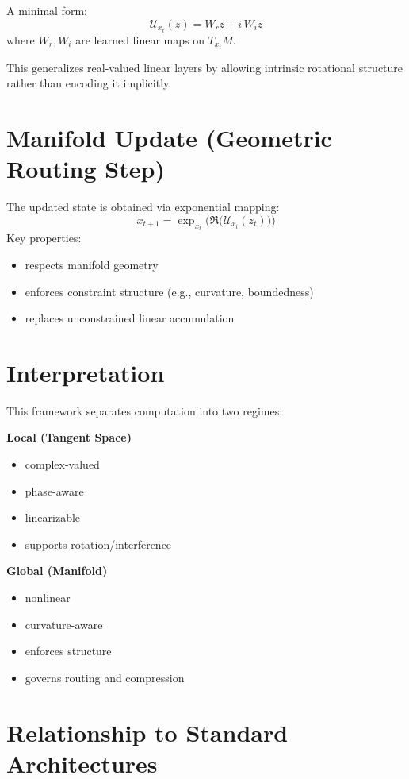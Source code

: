 \documentclass[11pt]{article}
\begin{document}
A minimal form:
\[
    \mathcal{U}_{x_t}(z) = W_r z + i\,W_i z
\]
where $W_r, W_i$ are learned linear maps on $T_{x_t}M$.

This generalizes real-valued linear layers by allowing intrinsic rotational structure rather
than encoding it implicitly.

\section{Manifold Update (Geometric Routing Step)}

The updated state is obtained via exponential mapping:
\[
    x_{t+1} = \exp_{x_t}\!\Big(\Re\bigl(\mathcal{U}_{x_t}(z_t)\bigr)\Big)
\]
Key properties:
\begin{itemize}
    \item respects manifold geometry
    \item enforces constraint structure (e.g., curvature, boundedness)
    \item replaces unconstrained linear accumulation
\end{itemize}

\section{Interpretation}

This framework separates computation into two regimes:

\textbf{Local (Tangent Space)}
\begin{itemize}
    \item complex-valued
    \item phase-aware
    \item linearizable
    \item supports rotation/interference
\end{itemize}

\textbf{Global (Manifold)}
\begin{itemize}
    \item nonlinear
    \item curvature-aware
    \item enforces structure
    \item governs routing and compression
\end{itemize}

\section{Relationship to Standard Architectures}
\end{document}
